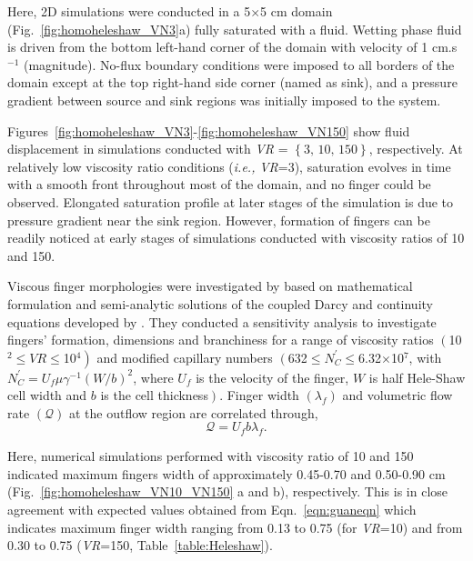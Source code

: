 \documentclass[preprint,authoryear,12pt]{elsarticle}
\newcommand{\ie}{{\it i.e., }}
\begin{document}
\medskip
Here, 2D simulations were conducted in a 5$\times$5 cm domain (Fig.~\ref{fig:homoheleshaw_VN3}a) fully saturated with a fluid. Wetting phase fluid is driven from the bottom left-hand corner of the domain with velocity of 1 cm.s$^{-1}$ (magnitude). No-flux boundary conditions were imposed to all borders of the domain except at the top right-hand side corner (named as sink), and a pressure gradient between source and sink regions was initially imposed to the system. 

\medskip
Figures~\ref{fig:homoheleshaw_VN3}-\ref{fig:homoheleshaw_VN150} show fluid displacement in simulations conducted with {\it VR} = $\left\{\text{3, 10, 150}\right\}$, respectively. At relatively low viscosity ratio conditions (\ie {\it VR}=3), saturation evolves in time with a smooth front throughout most of the domain, and no finger could be observed. Elongated saturation profile at later stages of the simulation is due to pressure gradient near the sink region. However, formation of fingers can be readily noticed at early stages of simulations conducted with viscosity ratios of 10 and 150. 

\medskip
Viscous finger morphologies were investigated by \citet{guan_2003} based on mathematical formulation and semi-analytic solutions of the coupled Darcy and continuity equations developed by \citet{mclean_1981}. They conducted a sensitivity analysis to investigate fingers' formation, dimensions and branchiness for a range of viscosity ratios $\left(\right.$10$^{2}\le\textit{VR}\le$10$\left.^{4}\right)$ and modified capillary numbers $\left(\right.$632$\le N_{C}^{'}\le$6.32$\times$10$^{7}$, with $N_{C}^{'}= U_{f}\mu\gamma^{-1}(W/b)^{2}$, where $U_{f}$ is the velocity of the finger, $W$ is half Hele-Shaw cell width and $b$ is the cell thickness$\left.\right)$. Finger width $\left(\lambda_{f}\right)$ and volumetric flow rate $\left(\mathcal{Q}\right)$ at the outflow region are correlated through,   
\begin{equation}   
   \mathcal{Q} = U_{f} b \lambda_{f}.\label{eqn:guaneqn} 
\end{equation}  

\noindent Here, numerical simulations performed with viscosity ratio of 10 and 150 indicated maximum fingers width of approximately 0.45-0.70 and 0.50-0.90 cm (Fig.~\ref{fig:homoheleshaw_VN10_VN150} a and b), respectively. This is in close agreement with expected values obtained from Eqn.~\ref{eqn:guaneqn} which indicates maximum finger width ranging from 0.13 to 0.75 (for {\it VR}=10) and from 0.30 to 0.75 ({\it VR}=150, Table~\ref{table:Heleshaw}). 
  
\end{document}
